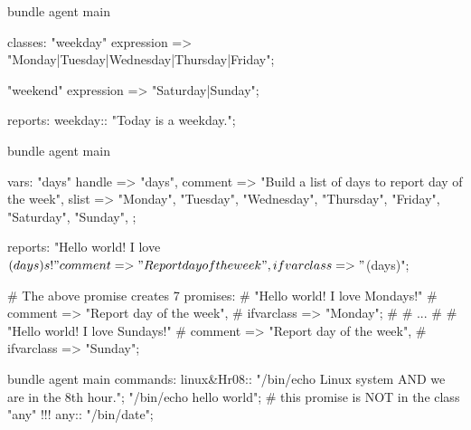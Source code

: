 \begin{codelisting}
\begin{code}
bundle agent main
{
  classes:
      "weekday"
        expression => "Monday|Tuesday|Wednesday|Thursday|Friday";

      "weekend"
        expression => "Saturday|Sunday";

  reports:
    weekday::
      "Today is a weekday.";
}
\end{code}
\end{codelisting}
\begin{codelisting}
\begin{code}
bundle agent main
{
  vars:
      "days"
        handle => "days",
        comment => "Build a list of days to report day of the week",
        slist => { "Monday",
                   "Tuesday",
                   "Wednesday",
                   "Thursday",
                   "Friday",
                   "Saturday",
                   "Sunday",
        };

  reports:
      "Hello world!  I love $(days)s!"
        comment => "Report day of the week",
        ifvarclass => "$(days)";

# The above promise creates 7 promises:
#      "Hello world!  I love Mondays!"
#        comment => "Report day of the week",
#        ifvarclass => "Monday";
#
#       ...
#
#      "Hello world!  I love Sundays!"
#        comment => "Report day of the week",
#        ifvarclass => "Sunday";

}
\end{code}
\end{codelisting}
\begin{codelisting}
\begin{code}
bundle agent main
{
  commands:
    linux&Hr08::
      "/bin/echo Linux system AND we are in the 8th hour.";
      "/bin/echo hello world";   # this promise is NOT in the class "any" !!!
    any::
      "/bin/date";
}
\end{code}
\end{codelisting}





